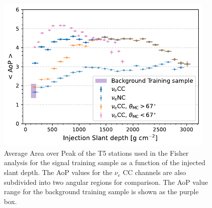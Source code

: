 
\begin{figure}[t!]
  \centering
  \includegraphics[width=0.95\textwidth]{thesis_figures/Nu_analysis/Nu_eff/Selection_Evo_AoP_X_MC_wnt_redcut.pdf}
  \caption{Average Area over Peak of the T5 stations used in the Fisher analysis for the signal training sample as a function of the injected slant depth. The AoP values for the $\nu_e$ CC channels are also subdivided into two angular regions for comparison. The AoP value range for the background training sample is shown as the purple box.}
  \label{fig:AoP_v_X}
\end{figure}

